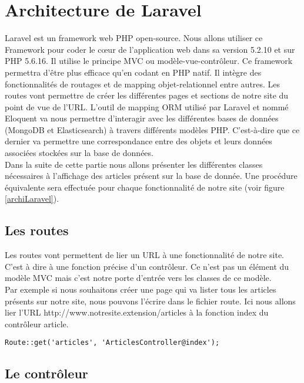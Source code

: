 \newpage
\section{Architecture de Laravel}
\label{sec:laravel}

Laravel\cite{Laravel} est un framework web PHP open-source. Nous allons utiliser ce Framework pour coder le cœur de l'application web dans sa version 5.2.10 et sur PHP 5.6.16. Il utilise le principe MVC ou modèle-vue-contrôleur. Ce framework permettra d'être plus efficace qu'en codant en PHP natif. Il intègre des fonctionnalités de routages et de mapping objet-relationnel entre autres. Les routes vont permettre de créer les différentes pages et sections de notre site du point de vue de l'URL. L'outil de mapping ORM utilisé par Laravel et nommé Eloquent va nous permettre d'interagir avec les différentes bases de données (MongoDB et Elasticsearch) à travers différents modèles PHP. C'est-à-dire que ce dernier va permettre une correspondance entre des objets et leurs données associées stockées sur la base de données.\\
Dans la suite de cette partie nous allons présenter les différentes classes nécessaires à l'affichage des articles présent sur la base de donnée. Une procédure équivalente sera effectuée pour chaque fonctionnalité de notre site (voir figure \ref{archiLaravel}).

\subsection{Les routes}

Les routes vont permettent de lier un URL à une fonctionnalité de notre site. C'est à dire à une fonction précise d'un contrôleur. Ce n'est pas un élément du modèle MVC mais c'est notre porte d'entrée vers les classes de ce modèle.\\
Par exemple si nous souhaitons créer une page qui va lister tous les articles présents sur notre site, nous pouvons l'écrire dans le fichier route. Ici nous allons lier l'URL http://www.notresite.extension/articles à la fonction index du contrôleur article.

\begin{verbatim}
Route::get('articles', 'ArticlesController@index');
\end{verbatim}

\subsection{Le contrôleur}

